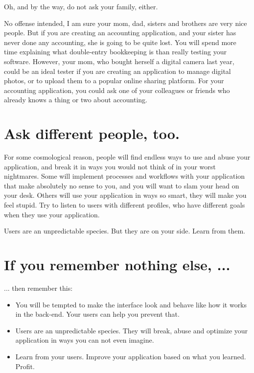 Oh, and by the way, do not ask your family, either.

No offense intended, I am sure your mom, dad, sisters and brothers are very nice people.
But if you are creating an accounting application, and your sister has never done any accounting,
she is going to be quite lost. You will spend more time explaining what double-entry bookkeeping is
 than really testing your software. However, your mom, who bought herself a digital camera last year,
could be an ideal tester if you are creating an application to manage digital photos, or to upload
them to a popular online sharing platform. For your accounting application, you could ask one of
your colleagues or friends who already knows a thing or two about accounting.

\section*{Ask different people, too.}

For some cosmological reason, people will find endless ways to use and abuse
your application, and break it in ways you would not think of in your worst
nightmares. Some will implement processes and workflows with your application
that make absolutely no sense to you, and you will want to slam your head on
your desk. Others will use your application in ways so smart, they will make you
feel stupid. Try to listen to users with different profiles, who have different
goals when they use your application.

Users are an unpredictable species. But they are on your side. Learn from them.

\section*{If you remember nothing else, ...}
... then remember this:
\begin{itemize}
 \item You will be tempted to make the interface look and behave like how it
works in the back-end. Your users can help you prevent that.
 \item Users are an unpredictable species. They will break, abuse and optimize
your application in ways you can not even imagine.
 \item Learn from your users. Improve your application based on what you
learned. Profit.
\end{itemize}
